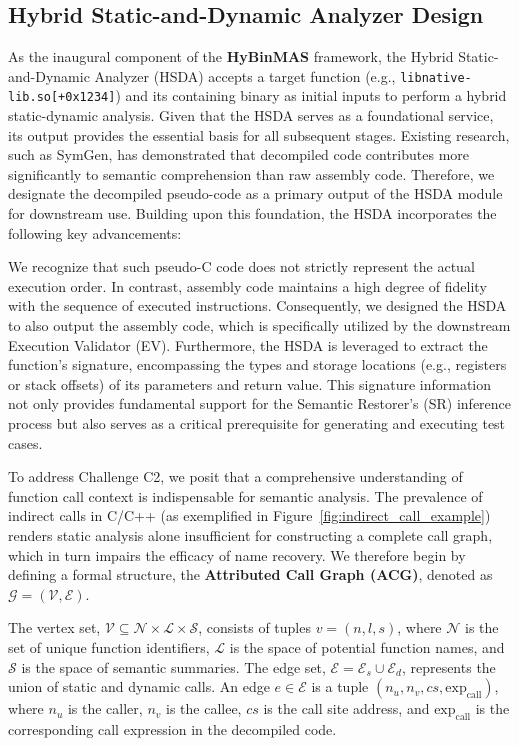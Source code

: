 \documentclass[acmsmall,screen,review,anonymous]{acmart} %
\begin{document}
\subsection{Hybrid Static-and-Dynamic Analyzer Design}
\label{sec:hsda_design}

As the inaugural component of the \textbf{HyBinMAS} framework, the Hybrid Static-and-Dynamic Analyzer (HSDA) accepts a target function (e.g., \texttt{libnative-lib.so[+0x1234]}) and its containing binary as initial inputs to perform a hybrid static-dynamic analysis. Given that the HSDA serves as a foundational service, its output provides the essential basis for all subsequent stages. Existing research, such as SymGen, has demonstrated that decompiled code contributes more significantly to semantic comprehension than raw assembly code. Therefore, we designate the decompiled pseudo-code as a primary output of the HSDA module for downstream use. Building upon this foundation, the HSDA incorporates the following key advancements:

We recognize that such pseudo-C code does not strictly represent the actual execution order. In contrast, assembly code maintains a high degree of fidelity with the sequence of executed instructions. Consequently, we designed the HSDA to also output the assembly code, which is specifically utilized by the downstream Execution Validator (EV). Furthermore, the HSDA is leveraged to extract the function's signature, encompassing the types and storage locations (e.g., registers or stack offsets) of its parameters and return value. This signature information not only provides fundamental support for the Semantic Restorer's (SR) inference process but also serves as a critical prerequisite for generating and executing test cases.

To address Challenge C2, we posit that a comprehensive understanding of function call context is indispensable for semantic analysis. The prevalence of indirect calls in C/C++ (as exemplified in Figure~\ref{fig:indirect_call_example}) renders static analysis alone insufficient for constructing a complete call graph, which in turn impairs the efficacy of name recovery. We therefore begin by defining a formal structure, the \textbf{Attributed Call Graph (ACG)}, denoted as \( \mathcal{G} = (\mathcal{V}, \mathcal{E}) \).

The vertex set, \(\mathcal{V} \subseteq \mathcal{N} \times \mathcal{L} \times \mathcal{S}\), consists of tuples \(v = (n, l, s)\), where \(\mathcal{N}\) is the set of unique function identifiers, \(\mathcal{L}\) is the space of potential function names, and \(\mathcal{S}\) is the space of semantic summaries. The edge set, \(\mathcal{E} = \mathcal{E}_{s} \cup \mathcal{E}_{d}\), represents the union of static and dynamic calls. An edge \(e \in \mathcal{E}\) is a tuple \((n_u, n_v, cs, \text{exp}_{\text{call}})\), where \(n_u\) is the caller, \(n_v\) is the callee, \(cs\) is the call site address, and \(\text{exp}_{\text{call}}\) is the corresponding call expression in the decompiled code.
\end{document}
